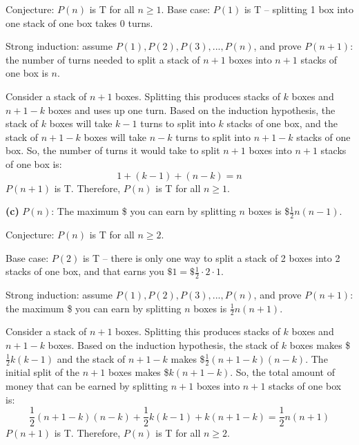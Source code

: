 \documentclass[fleqn]{article}
\begin{document}
Conjecture: $P(n)$ is T for all $n \geq 1$.
Base case: $P(1)$ is T -- splitting 1 box into one stack of one box takes 0 turns.\par
Strong induction: assume $P(1),P(2),P(3),...,P(n)$, and prove $P(n+1)$: the number of turns needed to split a stack of $n+1$ boxes into $n+1$ stacks of one box is $n$.
\begin{addmargin}{2em}
	Consider a stack of $n+1$ boxes. Splitting this produces stacks of $k$ boxes and $n+1-k$ boxes and uses up one turn. Based on the induction hypothesis, the stack of $k$ boxes will take $k-1$ turns to split into $k$ stacks of one box, and the stack of $n+1-k$ boxes will take $n-k$ turns to split into $n+1-k$ stacks of one box. So, the number of turns it would take to split $n+1$ boxes into $n+1$ stacks of one box is:
	\begin{equation*}
		1+(k-1)+(n-k) = n
	\end{equation*}
	$P(n+1)$ is T. Therefore, $P(n)$ is T for all $n \geq 1$.
\end{addmargin}\vspace{1em}
\textbf{(c)} $P(n)$: The maximum \$ you can earn by splitting $n$ boxes is \$$\frac{1}{2}n(n-1)$.\par
Conjecture: $P(n)$ is T for all $n \geq 2$.\par
Base case: $P(2)$ is T -- there is only one way to split a stack of 2 boxes into 2 stacks of one box, and that earns you $\$1 = \$\frac{1}{2}\cdot 2 \cdot 1$.\par
Strong induction: assume $P(1),P(2),P(3),...,P(n)$, and prove $P(n+1)$: the maximum \$ you can earn by splitting $n$ boxes is $\frac{1}{2}n(n+1)$.\par
\begin{addmargin}{2em}
	Consider a stack of $n+1$ boxes. Splitting this produces stacks of $k$ boxes and $n+1-k$ boxes. Based on the induction hypothesis, the stack of $k$ boxes makes \$$\frac{1}{2}k(k-1)$ and the stack of $n+1-k$ makes \$$\frac{1}{2}(n+1-k)(n-k)$. The initial split of the $n+1$ boxes makes \$$k(n+1-k)$. So, the total amount of money that can be earned by splitting $n+1$ boxes into $n+1$ stacks of one box is:
	\begin{equation*}
		\frac{1}{2}(n+1-k)(n-k) + \frac{1}{2}k(k-1) + k(n+1-k)=\frac{1}{2}n(n+1)
	\end{equation*}
	$P(n+1)$ is T. Therefore, $P(n)$ is T for all $n \geq 2$.
\end{addmargin}
\end{document}
